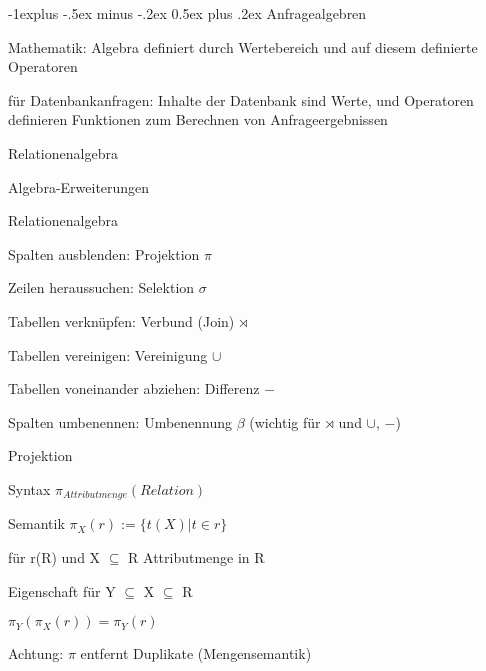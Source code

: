 \documentclass[a4paper]{article}
\makeatletter
\renewcommand{\subsection}{\@startsection{subsection}{2}{0mm}%
                                {-1explus -.5ex minus -.2ex}%
                                {0.5ex plus .2ex}%
                                {\normalfont\normalsize\bfseries}}
\makeatother
\begin{document}
\begin{multicols}{3}
\subsection{Anfragealgebren}
\begin{itemize*}
    \item Mathematik: Algebra definiert durch Wertebereich und auf diesem definierte Operatoren
    \item für Datenbankanfragen: Inhalte der Datenbank sind Werte, und Operatoren definieren Funktionen zum Berechnen von Anfrageergebnissen
    \begin{itemize*}
        \item Relationenalgebra
        \item Algebra-Erweiterungen
    \end{itemize*}
\end{itemize*}

Relationenalgebra
\begin{itemize*}
    \item Spalten ausblenden: Projektion $\pi$
    \item Zeilen heraussuchen: Selektion $\sigma$
    \item Tabellen verknüpfen: Verbund (Join) $\rtimes$
    \item Tabellen vereinigen: Vereinigung $\cup$
    \item Tabellen voneinander abziehen: Differenz $-$
    \item Spalten umbenennen: Umbenennung $\beta$ (wichtig für $\rtimes$ und $\cup$, $-$)
\end{itemize*}

Projektion
\begin{itemize*}
    \item Syntax $\pi_{Attributmenge}(Relation)$
    \item Semantik $\pi_X (r) := \{t(X) | t \in r\}$
    \begin{itemize*}
        \item für r(R) und X $\subseteq$ R Attributmenge in R
    \end{itemize*}
    \item Eigenschaft für Y $\subseteq$ X $\subseteq$ R
    \begin{itemize*}
        \item $\pi_Y (\pi_X (r)) = \pi_Y (r)$
    \end{itemize*}
    \item Achtung: $\pi$ entfernt Duplikate (Mengensemantik)
\end{itemize*}


\end{multicols}
\end{document}
